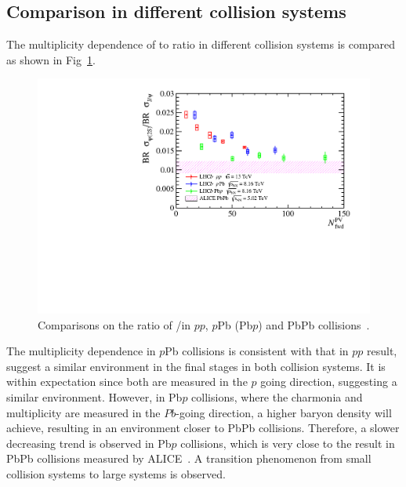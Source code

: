 \subsection{Comparison in different collision systems}
The multiplicity dependence of \psitwos to \jpsi ratio in different collision systems is compared as shown in Fig~\ref{pppPb}. 
\begin{figure}[H]
  \begin{center}
  \includegraphics[width=0.7\linewidth]{LHCb-latex-template/latest/latex/pdf/pPb/FWorkdir/Result/pppPb.pdf}
  \end{center}
  \caption{Comparisons on the ratio of \psitwos/\jpsi in $pp$, $p$Pb (Pb$p$) and PbPb collisions~\cite{ALICE:2022jeh}.}
\label{pppPb}
\end{figure}
The multiplicity dependence in $p$Pb collisions is consistent with that in $pp$ result, suggest a similar environment in the final stages in both collision systems. It is within expectation since both are measured in the $p$ going direction, suggesting a similar environment. However, in Pb$p$ collisions, where the charmonia and multiplicity are measured in the $Pb$-going direction, a higher baryon density will achieve, resulting in an environment closer to PbPb collisions. Therefore, a slower decreasing trend is observed in Pb$p$ collisions, which is very close to the result in PbPb collisions measured by ALICE~\cite{ALICE:2022jeh}. A transition phenomenon from small collision systems to large systems is observed.





